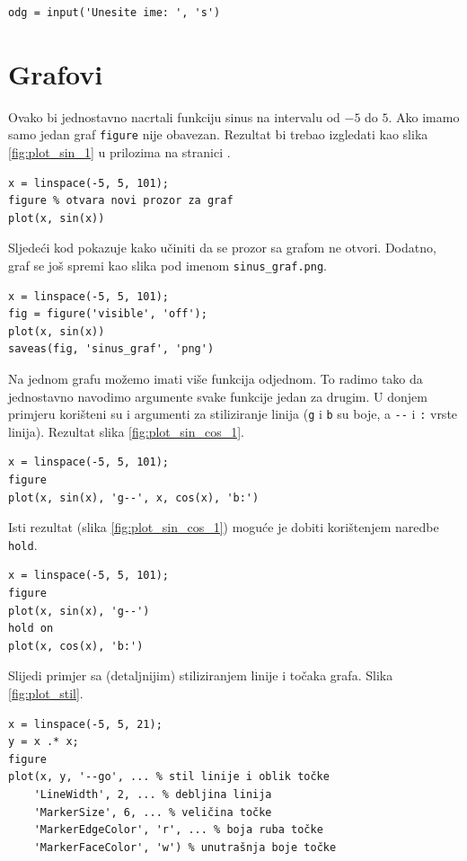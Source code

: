 \documentclass[a4paper, 10pt]{article}
\begin{document}
\begin{lstlisting}
odg = input('Unesite ime: ', 's')
\end{lstlisting}

\section{Grafovi}

Ovako bi jednostavno nacrtali funkciju sinus na intervalu od $-5$ do $5$. Ako imamo samo jedan graf \texttt{figure} nije obavezan. Rezultat bi trebao izgledati kao slika \ref{fig:plot_sin_1} u prilozima na stranici \pageref{sec:prilozi}.

\begin{lstlisting}
x = linspace(-5, 5, 101);
figure % otvara novi prozor za graf
plot(x, sin(x))
\end{lstlisting}

Sljedeći kod pokazuje kako učiniti da se prozor sa grafom ne otvori. Dodatno, graf se još spremi kao slika pod imenom \texttt{sinus\_graf.png}.

\begin{lstlisting}
x = linspace(-5, 5, 101);
fig = figure('visible', 'off');
plot(x, sin(x))
saveas(fig, 'sinus_graf', 'png')
\end{lstlisting}

Na jednom grafu možemo imati više funkcija odjednom. To radimo tako da jednostavno navodimo argumente svake funkcije jedan za drugim. U donjem primjeru korišteni su i argumenti za stiliziranje linija (\texttt{g} i \texttt{b} su boje, a \texttt{-{}-} i \texttt{:} vrste linija). Rezultat slika \ref{fig:plot_sin_cos_1}.

\begin{lstlisting}
x = linspace(-5, 5, 101);
figure
plot(x, sin(x), 'g--', x, cos(x), 'b:')
\end{lstlisting}

Isti rezultat (slika \ref{fig:plot_sin_cos_1}) moguće je dobiti korištenjem naredbe \texttt{hold}.

\begin{lstlisting}
x = linspace(-5, 5, 101);
figure
plot(x, sin(x), 'g--')
hold on
plot(x, cos(x), 'b:')
\end{lstlisting}

Slijedi primjer sa (detaljnijim) stiliziranjem linije i točaka grafa. Slika \ref{fig:plot_stil}.

\begin{lstlisting}
x = linspace(-5, 5, 21);
y = x .* x;
figure
plot(x, y, '--go', ... % stil linije i oblik točke
    'LineWidth', 2, ... % debljina linija
    'MarkerSize', 6, ... % veličina točke
    'MarkerEdgeColor', 'r', ... % boja ruba točke
    'MarkerFaceColor', 'w') % unutrašnja boje točke
\end{lstlisting}
\end{document}
